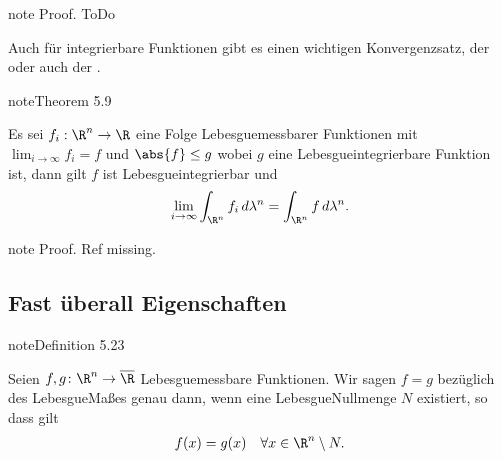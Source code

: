 \documentclass[letterpaper,10pt,german]{jupyterBook}
\begin{document}
\begin{sphinxadmonition}{note}
\sphinxAtStartPar
Proof. ToDo
\end{sphinxadmonition}

\sphinxAtStartPar
Auch für integrierbare Funktionen gibt es einen wichtigen Konvergenzsatz, der  oder auch der .
\label{masstheorie/lebesgue_integral:theorem-18}
\begin{sphinxadmonition}{note}{Theorem 5.9}



\sphinxAtStartPar
Es sei \(f_i:\R^n\to\R\) eine Folge Lebesgue\sphinxhyphen{}messbarer Funktionen mit \(\lim_{i\to\infty} f_i =f\) und \(\abs{f}\leq g\) wobei \(g\) eine Lebesgue\sphinxhyphen{}integrierbare Funktion ist, dann gilt \(f\) ist Lebesgue\sphinxhyphen{}integrierbar und
\begin{equation*}
\begin{split}\lim_{i\to\infty} \int_{\R^n} f_i\, d\lambda^n = \int_{\R^n} f\, d\lambda^n.\end{split}
\end{equation*}\end{sphinxadmonition}

\begin{sphinxadmonition}{note}
\sphinxAtStartPar
Proof. Ref missing.
\end{sphinxadmonition}


\subsection{Fast überall Eigenschaften}
\label{\detokenize{masstheorie/lebesgue_integral:fast-uberall-eigenschaften}}\label{masstheorie/lebesgue_integral:definition-19}
\begin{sphinxadmonition}{note}{Definition 5.23}



\sphinxAtStartPar
Seien \(f,g \colon \R^n \rightarrow \overline{\R}\) Lebesgue\sphinxhyphen{}messbare Funktionen.
Wir sagen \(f = g\)  bezüglich des Lebesgue\sphinxhyphen{}Maßes genau dann, wenn eine Lebesgue\sphinxhyphen{}Nullmenge \(N\) existiert, so dass gilt
\begin{equation*}
\begin{split}f(x) = g(x) \quad \forall x \in \R^n \setminus N.\end{split}
\end{equation*}\end{sphinxadmonition}
\end{document}
